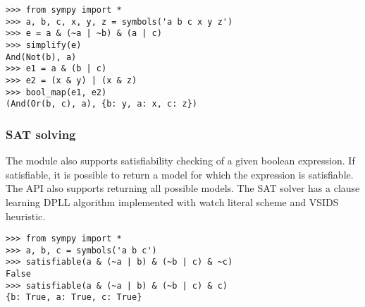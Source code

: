 \begin{verbatim}
>>> from sympy import *
>>> a, b, c, x, y, z = symbols('a b c x y z')
>>> e = a & (~a | ~b) & (a | c)
>>> simplify(e)
And(Not(b), a)
>>> e1 = a & (b | c)
>>> e2 = (x & y) | (x & z)
>>> bool_map(e1, e2)
(And(Or(b, c), a), {b: y, a: x, c: z})
\end{verbatim}

\subsubsection{SAT solving}

The module also supports satisfiability checking of a given
boolean expression. If satisfiable, it is possible to return
a model for which the expression is satisfiable. The API also
supports returning all possible models. The SAT solver has
a clause learning DPLL algorithm implemented with watch
literal scheme and VSIDS heuristic\cite{moskewicz2008method}.

\begin{verbatim}
>>> from sympy import *
>>> a, b, c = symbols('a b c')
>>> satisfiable(a & (~a | b) & (~b | c) & ~c)
False
>>> satisfiable(a & (~a | b) & (~b | c) & c)
{b: True, a: True, c: True}
\end{verbatim}
